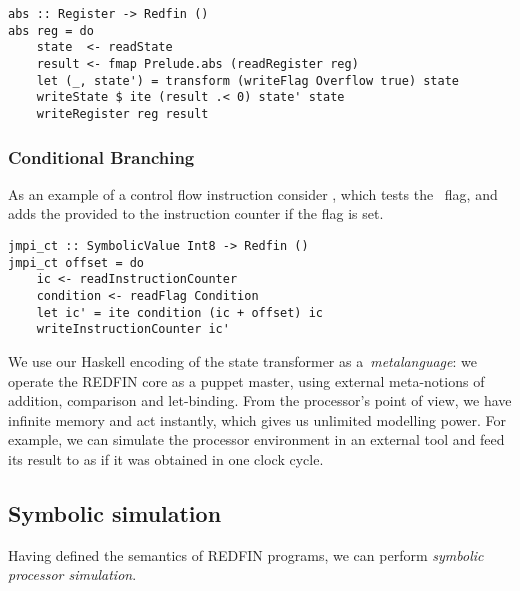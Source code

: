 \vspace{1mm}
\begin{verbatim}
abs :: Register -> Redfin ()
abs reg = do
    state  <- readState
    result <- fmap Prelude.abs (readRegister reg)
    let (_, state') = transform (writeFlag Overflow true) state
    writeState $ ite (result .< 0) state' state
    writeRegister reg result
\end{verbatim}
\vspace{1mm}

\subsubsection{Conditional Branching}
As an example of a control flow instruction consider , which
tests the~ flag, and adds the provided  to the
instruction counter if the flag is set.

\vspace{1mm}
\begin{verbatim}
jmpi_ct :: SymbolicValue Int8 -> Redfin ()
jmpi_ct offset = do
    ic <- readInstructionCounter
    condition <- readFlag Condition
    let ic' = ite condition (ic + offset) ic
    writeInstructionCounter ic'
\end{verbatim}
\vspace{1mm}

\noindent
We use our Haskell encoding of the state transformer as a~\emph{metalanguage}:
we operate the REDFIN core as a puppet master, using external meta-notions of
addition, comparison and let-binding. From the processor's
point of view, we have infinite memory and act instantly, which gives us unlimited
modelling power. For example, we can simulate the processor environment
in an external tool and feed its result to  as if it was
obtained in one clock cycle.

\subsection{Symbolic simulation}

Having defined the semantics of REDFIN programs, we can perform
\emph{symbolic processor simulation}.

